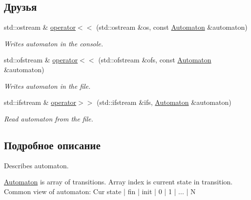 \subsection*{Друзья}
\begin{DoxyCompactItemize}
\item 
\mbox{\label{classautomaton_1_1_automaton_a5ab2e601e3ac7567e9ceaf410ebb9762}} 
std\+::ostream \& \mbox{\hyperlink{classautomaton_1_1_automaton_a5ab2e601e3ac7567e9ceaf410ebb9762}{operator$<$$<$}} (std\+::ostream \&os, const \mbox{\hyperlink{classautomaton_1_1_automaton}{Automaton}} \&automaton)
\begin{DoxyCompactList}\small\item\em Writes automaton in the console. \end{DoxyCompactList}\item 
\mbox{\label{classautomaton_1_1_automaton_ab49c0362ae9daafaffd1e252601c1874}} 
std\+::ofstream \& \mbox{\hyperlink{classautomaton_1_1_automaton_ab49c0362ae9daafaffd1e252601c1874}{operator$<$$<$}} (std\+::ofstream \&ofs, const \mbox{\hyperlink{classautomaton_1_1_automaton}{Automaton}} \&automaton)
\begin{DoxyCompactList}\small\item\em Writes automaton in the file. \end{DoxyCompactList}\item 
\mbox{\label{classautomaton_1_1_automaton_aa21b7fbccaa6a68ec1cc285f490dc9de}} 
std\+::ifstream \& \mbox{\hyperlink{classautomaton_1_1_automaton_aa21b7fbccaa6a68ec1cc285f490dc9de}{operator$>$$>$}} (std\+::ifstream \&ifs, \mbox{\hyperlink{classautomaton_1_1_automaton}{Automaton}} \&automaton)
\begin{DoxyCompactList}\small\item\em Read automaton from the file. \end{DoxyCompactList}\end{DoxyCompactItemize}


\subsection{Подробное описание}
Describes automaton. 


\begin{DoxyPre}
\mbox{\hyperlink{classautomaton_1_1_automaton}{Automaton}} is array of transitions.
Array index is current state in transition.
Common view of automaton:
Cur state | fin | init | 0 | 1 | ... | N
\end{DoxyPre}
 


